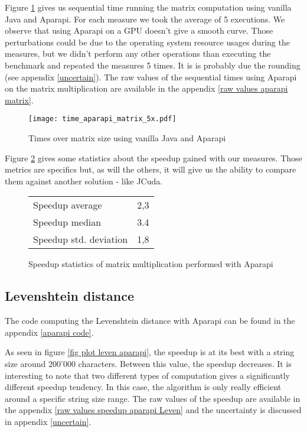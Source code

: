 Figure \ref{fig: plot aparapi matrix times} gives us sequential time running the matrix computation using vanilla Java and Aparapi. For each measure we took the average of 5 executions. We observe that using Aparapi on a GPU doesn't give a smooth curve. Those perturbations could be due to the operating system resource usages during the measures, but we didn't perform any other operations than executing the benchmark and repeated the measures 5 times. It is is probably due the rounding (see appendix \ref{uncertain}). The raw values of the sequential times using Aparapi on the matrix multiplication are available in the appendix \ref{raw values aparapi matrix}.

\begin{figure}[H]
\centering
\texttt{[image: time\_aparapi\_matrix\_5x.pdf]}
\caption{Times over matrix size using vanilla Java and Aparapi}
\label{fig: plot aparapi matrix times}
\end{figure}

Figure \ref{fig table matrix aparapi} gives some statistics about the speedup gained with our measures. Those metrics are specifics but, as will the others, it will give us the ability to compare them against another solution - like JCuda.

\begin{figure}[H]
\begin{center}
\begin{tabular}{ |l|l| } 
 \hline
 Speedup average & 2,3 \\ 
 Speedup median & 3.4 \\ 
 Speedup std. deviation & 1,8 \\ 
 \hline
\end{tabular}
\end{center}
\caption{Speedup statistics of matrix multiplication performed with Aparapi}
\label{fig table matrix aparapi}
\end{figure}

\subsection{Levenshtein distance}

The code computing the Levenshtein distance with Aparapi can be found in the appendix \ref{aparapi code}.

As seen in figure \ref{fig plot leven aparapi}, the speedup is at its best with a string size around 200'000 characters. Between this value, the speedup decreases. It is interesting to note that two different types of computation gives a significantly different speedup tendency. In this case, the algorithm is only really efficient around a specific string size range. The raw values of the speedup are available in the appendix \ref{raw values speedup aparapi Leven} and the uncertainty is discussed in appendix \ref{uncertain}.


